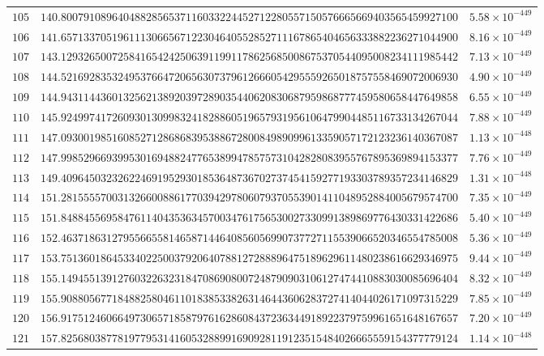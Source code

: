 \documentclass[12pt,reqno]{amsart}
\theoremstyle{remark}
\begin{document}
\begin{longtable}{clc}
$105$ & $140.8007910896404882856537116033224452712280557150576665669403565459927100$ & $5.58\times 10^{-449}$ \\
$106$ & $141.6571337051961113066567122304640552852711167865404656333882236271044900$ & $8.16\times 10^{-449}$ \\
$107$ & $143.1293265007258416542425063911991178625685008675370544095008234111985442$ & $7.13\times 10^{-449}$ \\
$108$ & $144.5216928353249537664720656307379612666054295559265018757558469072006930$ & $4.90\times 10^{-449}$ \\
$109$ & $144.9431144360132562138920397289035440620830687959868777459580658447649858$ & $6.55\times 10^{-449}$ \\
$110$ & $145.9249974172609301309983241828860519657931956106479904485116733134267044$ & $7.88\times 10^{-449}$ \\
$111$ & $147.0930019851608527128686839538867280084989099613359057172123236140367087$ & $1.13\times 10^{-448}$ \\
$112$ & $147.9985296693995301694882477653899478575731042828083955767895369894153377$ & $7.76\times 10^{-449}$ \\
$113$ & $149.4096450323262246919529301853648736702737454159277193303789357234146829$ & $1.31\times 10^{-448}$ \\
$114$ & $151.2815555700313266008861770394297806079370553901411048952884005679574700$ & $7.35\times 10^{-449}$ \\
$115$ & $151.8488455695847611404353634570034761756530027330991389869776430331422686$ & $5.40\times 10^{-449}$ \\
$116$ & $152.4637186312795566558146587144640856056990737727115539066520346554785008$ & $5.36\times 10^{-449}$ \\
$117$ & $153.7513601864533402250037920640788127288896475189629611480238616629346975$ & $9.44\times 10^{-449}$ \\
$118$ & $155.1494551391276032263231847086908007248790903106127474410883030085696404$ & $8.32\times 10^{-449}$ \\
$119$ & $155.9088056771848825804611018385338263146443606283727414044026171097315229$ & $7.85\times 10^{-449}$ \\
$120$ & $156.9175124606649730657185879761628608437236344918922379759961651648167657$ & $7.20\times 10^{-449}$ \\
$121$ & $157.8256803877819779531416053288991690928119123515484026665559154377779124$ & $1.14\times 10^{-448}$ \\

\end{longtable}
\end{document}
